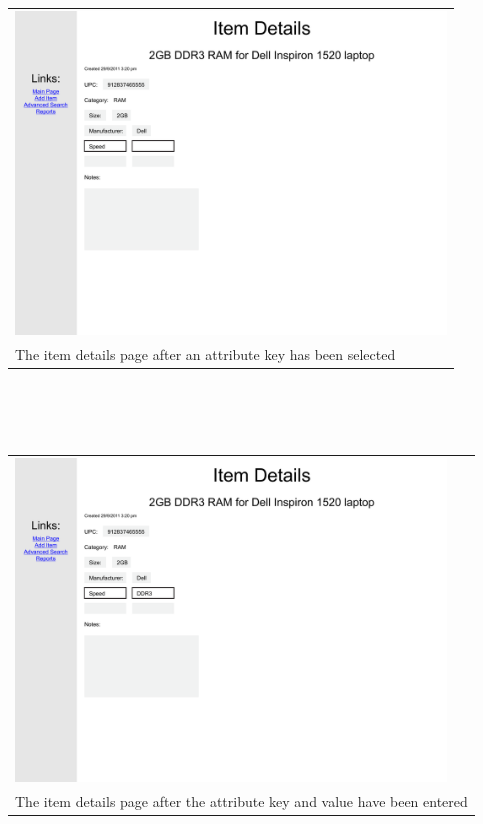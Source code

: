 \documentclass{article}
\begin{document}
\begin{tabular}{ p{4.5in} }
\includegraphics[keepaspectratio, width=4.5in]{modifyDetailsF0S2.pdf} \\
The item details page after an attribute key has been selected
\end{tabular}\\
~\\
~\\
\begin{tabular}{ p{4.5in} }
\includegraphics[keepaspectratio, width=4.5in]{modifyDetailsF0S3.pdf} \\
The item details page after the attribute key and value have been entered
\end{tabular}\\
~\\
~\\
\end{document}
